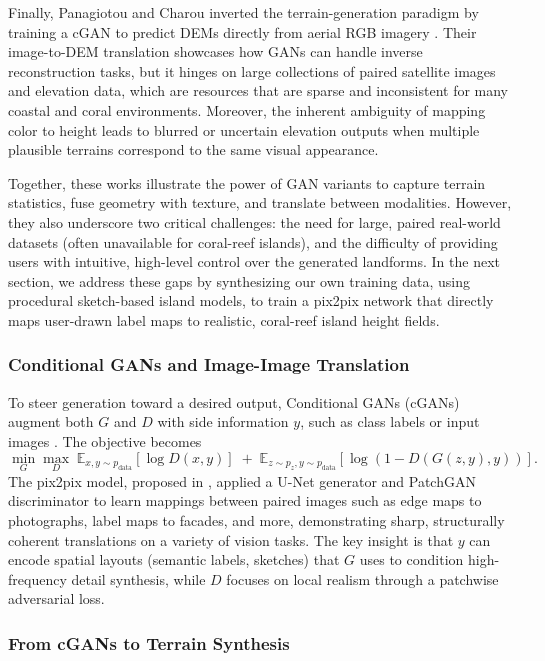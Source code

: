 Finally, Panagiotou and Charou inverted the terrain-generation paradigm by training a cGAN to predict DEMs directly from aerial RGB imagery \cite{Panagiotou2020}. Their image-to-DEM translation showcases how GANs can handle inverse reconstruction tasks, but it hinges on large collections of paired satellite images and elevation data, which are resources that are sparse and inconsistent for many coastal and coral environments. Moreover, the inherent ambiguity of mapping color to height leads to blurred or uncertain elevation outputs when multiple plausible terrains correspond to the same visual appearance.

Together, these works illustrate the power of GAN variants to capture terrain statistics, fuse geometry with texture, and translate between modalities. However, they also underscore two critical challenges: the need for large, paired real-world datasets (often unavailable for coral-reef islands), and the difficulty of providing users with intuitive, high-level control over the generated landforms. In the next section, we address these gaps by synthesizing our own training data, using procedural sketch-based island models, to train a pix2pix network that directly maps user-drawn label maps to realistic, coral-reef island height fields.  


\subsubsection{Conditional GANs and Image-Image Translation}
\label{sec:coral-island_sota-cGAN}

To steer generation toward a desired output, Conditional GANs (cGANs) augment both $G$ and $D$ with side information $y$, such as class labels or input images \cite{Mirza2014}.  The objective becomes
\[
\min_G \max_D \; \mathbb{E}_{x,y\sim p_{\text{data}}}[\log D(x,y)] \;+\;
\mathbb{E}_{z\sim p_z,y\sim p_{\text{data}}}[\log(1 - D(G(z,y),y))].
\]
The pix2pix model, proposed in \cite{Isola2017}, applied a U-Net generator and PatchGAN discriminator to learn mappings between paired images such as edge maps to photographs, label maps to facades, and more, demonstrating sharp, structurally coherent translations on a variety of vision tasks.  The key insight is that $y$ can encode spatial layouts (semantic labels, sketches) that $G$ uses to condition high-frequency detail synthesis, while $D$ focuses on local realism through a patchwise adversarial loss.

\subsubsection{From cGANs to Terrain Synthesis}
\label{sec:coral-island_sota-GAN-to-terrain}


